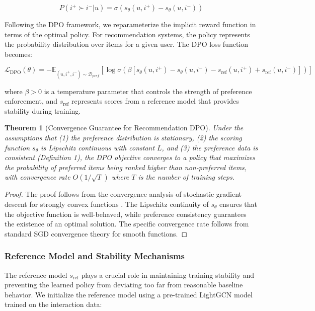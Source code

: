 \documentclass[pdflatex,sn-mathphys-num]{sn-jnl}%
\theoremstyle{thmstyleone}%
\newtheorem{theorem}{Theorem}%
\theoremstyle{thmstyletwo}%
\theoremstyle{thmstylethree}%
\begin{document}
\begin{equation}
P(i^+ \succ i^- | u) = \sigma(s_\theta(u, i^+) - s_\theta(u, i^-))
\end{equation}

Following the DPO framework, we reparameterize the implicit reward function in terms of the optimal policy. For recommendation systems, the policy represents the probability distribution over items for a given user. The DPO loss function becomes:

\begin{equation}
\mathcal{L}_{\text{DPO}}(\theta) = -\mathbb{E}_{(u,i^+,i^-) \sim \mathcal{D}_{pref}} \left[ \log \sigma\left(\beta \left[ s_{\theta}(u, i^+) - s_{\theta}(u, i^-) - s_{\text{ref}}(u, i^+) + s_{\text{ref}}(u, i^-) \right] \right) \right]
\end{equation}

where $\beta > 0$ is a temperature parameter that controls the strength of preference enforcement, and $s_{\text{ref}}$ represents scores from a reference model that provides stability during training.

\begin{theorem}[Convergence Guarantee for Recommendation DPO]
Under the assumptions that (1) the preference distribution is stationary, (2) the scoring function $s_\theta$ is Lipschitz continuous with constant $L$, and (3) the preference data is consistent (Definition 1), the DPO objective converges to a policy that maximizes the probability of preferred items being ranked higher than non-preferred items, with convergence rate $O(1/\sqrt{T})$ where $T$ is the number of training steps.
\end{theorem}

\begin{proof}
The proof follows from the convergence analysis of stochastic gradient descent for strongly convex functions \cite{bottou2010large}. The Lipschitz continuity of $s_\theta$ ensures that the objective function is well-behaved, while preference consistency guarantees the existence of an optimal solution. The specific convergence rate follows from standard SGD convergence theory for smooth functions.
\end{proof}

\subsubsection{Reference Model and Stability Mechanisms}

The reference model $s_{\text{ref}}$ plays a crucial role in maintaining training stability and preventing the learned policy from deviating too far from reasonable baseline behavior. We initialize the reference model using a pre-trained LightGCN model trained on the interaction data:
\end{document}
